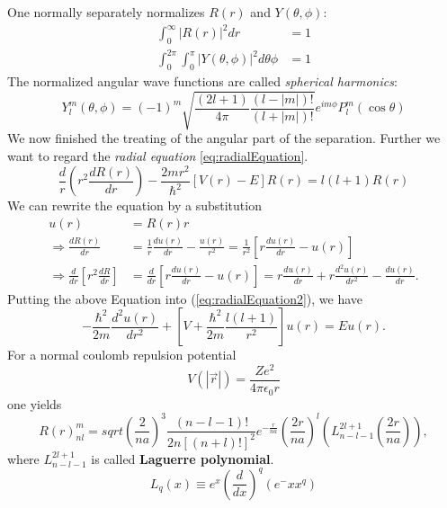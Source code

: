 			One normally separately normalizes $R(r)$ and $Y(\theta, \phi)$:
			\begin{align}
				\int_0^\infty |R(r)|^2 dr &= 1 \\
				\int_0^{2\pi} \int_0^{\pi} |Y(\theta, \phi)|^2 d \theta \phi &= 1
			\end{align}
			The normalized angular wave functions are called \textit{spherical harmonics}:
			\begin{equation}
				Y_l^m(\theta, \phi) = (-1)^m \sqrt{\frac{(2l+1)}{4 \pi} \frac{(l-|m|)!}{(l+|m|)!}} e^{im\phi} P_l^m(\cos \theta)
			\end{equation}
			We now finished the treating of the angular part of the separation. Further we want to regard the \textit{radial equation} \ref{eq:radialEquation}.
			\begin{equation}
				\label{eq:radialEquation2}
				\frac{d}{r} \left( r^2 \frac{d R(r)}{d r} \right) - \frac{2mr^2}{\hbar^2} [V(r) - E]R(r) = l(l + 1) R(r)
			\end{equation}
			We can rewrite the equation by a substitution
			\begin{align}
				u(r) &= R(r) r \\
				\Rightarrow \frac{dR(r)}{dr} &= \frac{1}{r} \frac{d u(r)}{dr} - \frac{u(r)}{r^2} = \frac{1}{r^2} \left[ r \frac{d u(r)}{d r} - u(r) \right] \\
				\Rightarrow \frac{d}{d r} \left[ r^2 \frac{d R}{d r} \right] &= \frac{d}{d r} \left[ r \frac{d u(r)}{d r} - u(r) \right] = r \frac{d u(r)}{d r} + r \frac{d^2 u(r)}{d r^2} - \frac{du(r)}{dr}.
			\end{align}
			Putting the above Equation into (\ref{eq:radialEquation2}), we have 
			\begin{equation}
				-\frac{\hbar^2}{2m} \frac{d^2 u(r)}{dr^2} + \left[ V + \frac{\hbar^2}{2m} \frac{l(l+1)}{r^2} \right] u(r) = Eu(r).
			\end{equation}
			For a normal coulomb repulsion potential
			\begin{equation}
				V(|\vec r|) = \frac{Ze^2}{4 \pi \epsilon_0 r} 
			\end{equation}
			one yields 
			\begin{equation}
				R(r)_{nl}^m = sqrt{\left( \frac{2}{na} \right)^3 \frac{(n-l-1)!}{2n[(n+l)!]^2}} e^{-\frac{r}{na}} \left( \frac{2r}{na} \right)^l \left( L_{n-l-1}^{2l+1} (\frac{2r}{na}) \right),
			\end{equation}
			where $L_{n-l-1}^{2l+1}$ is called \textbf{Laguerre polynomial}.
			\begin{equation}
				L_q(x) \equiv e^x \left( \frac{d}{dx} \right)^q \left( e^-x x^q \right)
			\end{equation}
